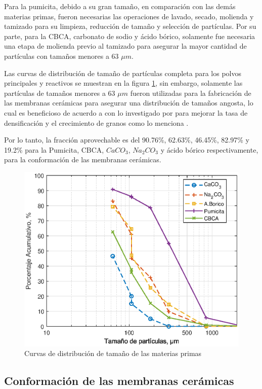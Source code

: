\documentclass{article}
\begin{document}
Para la pumicita, debido a su gran tamaño, en comparación con las demás materias primas, fueron necesarias las operaciones de lavado, secado, molienda y tamizado para su limpieza, reducción de tamaño y selección de partículas. Por su parte, para la CBCA, carbonato de sodio y ácido bórico, solamente fue necesaria una etapa de molienda previo al tamizado para asegurar la mayor cantidad de partículas con tamaños menores a 63 $\mu m$. 

Las curvas de distribución de tamaño de partículas completa para los polvos principales y reactivos se muestran en la figura \ref{fig:Distribucion_Particulas}, sin embargo, solamente las partículas de tamaños menores a 63 $\mu m$ fueron utilizadas para la fabricación de las membranas cerámicas para asegurar una distribución de tamaños angosta, lo cual es beneficioso de acuerdo a con lo investigado por \textcite{Lin1995} para mejorar la tasa de densificación y el crecimiento de granos como lo menciona \textcite{Kang2020}. 

Por lo tanto, la fracción aprovechable es del 90.76\%, 62.63\%, 46.45\%, 82.97\% y 19.2\% para la Pumicita, CBCA, $CaCO_3$, $Na_2CO_3$ y ácido bórico respectivamente, para la conformación de las membranas cerámicas. 

\begin{figure}[ht]
    \centering
    \includegraphics[width=0.7\linewidth]{Graphics/ParticleDistributionC.eps}
    \caption{Curvas de distribución de tamaño de las materias primas}
    \label{fig:Distribucion_Particulas}
\end{figure}

\subsection{Conformación de las membranas cerámicas}
\end{document}
